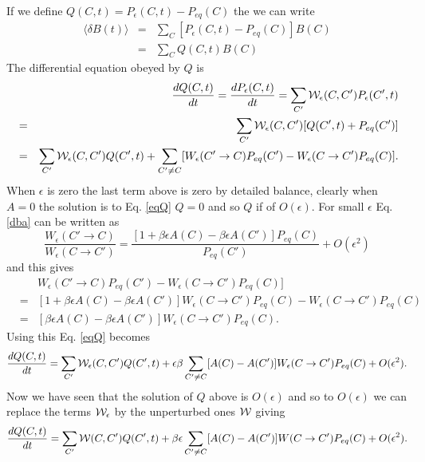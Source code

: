 \documentclass[11pt]{report}
\begin{document}
If we define $Q(C,t) = P_\epsilon(C,t) - P_{eq}(C)$ the we can write
\begin{eqnarray}
\langle \delta B(t)\rangle &=& \sum_{C} \left[ P_\epsilon(C,t) - P_{eq}(C)\right]B(C)\nonumber \\
&=& \sum_{C} Q(C,t)B(C)
\end{eqnarray}
The differential equation obeyed by $Q$  is
\begin{eqnarray}
&&\frac{dQ(C,t)}{dt} = \frac{dP_\epsilon(C,t)}{dt} = \sum_{C'} {\cal W}_\epsilon(C,C') P_\epsilon(C',t) \nonumber \\
&=& \sum_{C'} {\cal W}_\epsilon(C,C')[ Q(C',t) + P_{eq}(C')] \nonumber \\
&=& \sum_{C'} {\cal W}_\epsilon(C,C') Q(C',t) +\sum_{C'\neq C} [W_\epsilon(C'\to C)P_{eq}(C') - W_\epsilon(C\to C')P_{eq}(C)].\nonumber \\ \label{eqQ}
\end{eqnarray}
When $\epsilon$ is zero the last term above is zero by detailed balance, clearly when $A=0$ the 
solution is to Eq. \eqref{eqQ} $Q=0$ and so $Q$ if of $O(\epsilon)$. For small $\epsilon$ Eq. \eqref{dba} can be written as 
\begin{equation}
\frac{W_\epsilon(C'\to C)}{W_\epsilon(C \to C')} = \frac{[1+\beta \epsilon A(C)-\beta\epsilon A(C')] P_{eq}(C)}{P_{eq}(C')} +O(\epsilon^2)
\end{equation}
and this gives
\begin{eqnarray}
&&W_\epsilon(C'\to C)P_{eq}(C') - W_\epsilon(C\to C')P_{eq}(C)]\nonumber\\ &=& [1+\beta \epsilon A(C)-\beta\epsilon A(C')] W_\epsilon(C \to C')P_{eq}(C) -W_\epsilon(C\to C')P_{eq}(C)\nonumber \\
&=& [\beta \epsilon A(C)-\beta\epsilon A(C')] W_\epsilon(C \to C')P_{eq}(C).
\end{eqnarray}
Using this Eq. \eqref{eqQ} becomes
\begin{equation}
\frac{dQ(C,t)}{dt} = \sum_{C'} {\cal W}_\epsilon(C,C') Q(C',t) + \epsilon\beta\sum_{C'\neq C}[A(C)- A(C')] W_\epsilon(C \to C')P_{eq}(C) + O(\epsilon^2).
\end{equation}
Now we have seen that the solution of $Q$ above is $O(\epsilon)$ and so to $O(\epsilon)$ we can replace the terms ${\cal W}_\epsilon$ by the unperturbed ones ${\cal W}$ giving
\begin{equation}
\frac{dQ(C,t)}{dt} = \sum_{C'} {\cal W}(C,C') Q(C',t) + \beta\epsilon\sum_{C'\neq C}[ A(C)-A(C')] W(C \to C')P_{eq}(C) + O(\epsilon^2).\label{intq}
\end{equation}
\end{document}
